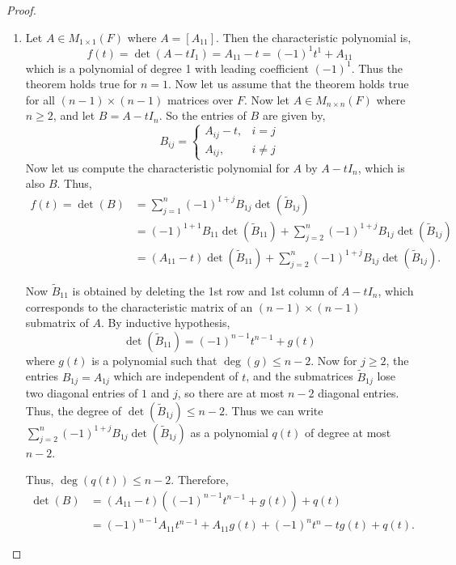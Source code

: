 \documentclass[12pt, a4paper]{article}
\theoremstyle{definition}
\theoremstyle{remark}
\begin{document}
\begin{proof}
\begin{enumerate}
    \item Let $A \in M_{1 \times 1}(F)$ where $A = [A_{11}]$. Then the characteristic polynomial is,
    \[
    f(t) = \det(A - t I_1) = A_{11} - t = (-1)^1 t^1 + A_{11}
    \]
    which is a polynomial of degree 1 with leading coefficient $(-1)^1$. Thus the theorem holds true for $n=1$. Now let us assume that the theorem holds true for all $(n-1) \times (n-1)$ matrices over $F$. Now let $A \in M_{n \times n}(F)$ where $n \ge 2$, and let $B = A - t I_n$. So the entries of $B$ are given by,
    \[
    B_{ij} = \begin{cases} 
    A_{ij} - t, & i = j \\ 
    A_{ij}, & i \neq j 
    \end{cases}
    \]
    Now let us compute the characteristic polynomial for $A$ by $A - t I_n$, which is also $B$. Thus,
    \begin{align*}
    f(t) = \det(B) &= \sum_{j=1}^{n} (-1)^{1+j} B_{1j} \det(\widetilde{B}_{1j}) \\
    &= (-1)^{1+1} B_{11} \det(\widetilde{B}_{11}) + \sum_{j=2}^{n} (-1)^{1+j} B_{1j} \det(\widetilde{B}_{1j}) \\
    &= (A_{11} - t) \det(\widetilde{B}_{11}) + \sum_{j=2}^{n} (-1)^{1+j} B_{1j} \det(\widetilde{B}_{1j}).
    \end{align*}

    Now $\widetilde{B}_{11}$ is obtained by deleting the 1st row and 1st column of $A - t I_n$, which corresponds to the characteristic matrix of an $(n-1) \times (n-1)$ submatrix of $A$. By inductive hypothesis,
    \[
    \det(\widetilde{B}_{11}) = (-1)^{n-1} t^{n-1} + g(t)
    \]
    where $g(t)$ is a polynomial such that $\deg(g) \le n-2$. Now for $j \ge 2$, the entries $B_{1j} = A_{1j}$ which are independent of $t$, and the submatrices $\widetilde{B}_{1j}$ lose two diagonal entries of $1$ and $j$, so there are at most $n-2$ diagonal entries. Thus, the degree of $\det(\widetilde{B}_{1j}) \le n-2$. Thus we can write $\displaystyle\sum_{j=2}^{n} (-1)^{1+j} B_{1j} \det(\widetilde{B}_{1j})$ as a polynomial $q(t)$ of degree at most $n-2$.

    Thus, $\deg(q(t)) \le n-2$. Therefore,
    \begin{align*}
    \det(B) &= (A_{11} - t)\left((-1)^{n-1} t^{n-1} + g(t)\right) + q(t) \\
    &= (-1)^{n-1} A_{11} t^{n-1} + A_{11} g(t) + (-1)^n t^n - t g(t) + q(t).
    \end{align*}


\end{enumerate}
\end{proof}
\end{document}
